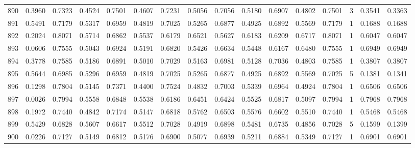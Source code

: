 \begin{tabular}{lrrrrrrrrrrrrrrr}
890 &      0.3960 &  0.7323 &  0.4524 &  0.7501 &  0.4607 &  0.7231 &  0.5056 &  0.7056 &  0.5180 &  0.6907 &   0.4802 &     0.7501 &      3 &                    0.3541 &                     0.3363 \\
891 &      0.5491 &  0.7179 &  0.5317 &  0.6959 &  0.4819 &  0.7025 &  0.5265 &  0.6877 &  0.4925 &  0.6892 &   0.5569 &     0.7179 &      1 &                    0.1688 &                     0.1688 \\
892 &      0.2024 &  0.8071 &  0.5714 &  0.6862 &  0.5537 &  0.6179 &  0.6521 &  0.5627 &  0.6183 &  0.6209 &   0.6717 &     0.8071 &      1 &                    0.6047 &                     0.6047 \\
893 &      0.0606 &  0.7555 &  0.5043 &  0.6924 &  0.5191 &  0.6820 &  0.5426 &  0.6634 &  0.5448 &  0.6167 &   0.6480 &     0.7555 &      1 &                    0.6949 &                     0.6949 \\
894 &      0.3778 &  0.7585 &  0.5186 &  0.6891 &  0.5010 &  0.7029 &  0.5163 &  0.6981 &  0.5128 &  0.7036 &   0.4803 &     0.7585 &      1 &                    0.3807 &                     0.3807 \\
895 &      0.5644 &  0.6985 &  0.5296 &  0.6959 &  0.4819 &  0.7025 &  0.5265 &  0.6877 &  0.4925 &  0.6892 &   0.5569 &     0.7025 &      5 &                    0.1381 &                     0.1341 \\
896 &      0.1298 &  0.7804 &  0.5145 &  0.7371 &  0.4400 &  0.7524 &  0.4832 &  0.7003 &  0.5339 &  0.6964 &   0.4924 &     0.7804 &      1 &                    0.6506 &                     0.6506 \\
897 &      0.0026 &  0.7994 &  0.5558 &  0.6848 &  0.5538 &  0.6186 &  0.6451 &  0.6424 &  0.5525 &  0.6817 &   0.5097 &     0.7994 &      1 &                    0.7968 &                     0.7968 \\
898 &      0.1972 &  0.7440 &  0.4842 &  0.7174 &  0.5147 &  0.6818 &  0.5762 &  0.6503 &  0.5576 &  0.6602 &   0.5510 &     0.7440 &      1 &                    0.5468 &                     0.5468 \\
899 &      0.5429 &  0.6828 &  0.5607 &  0.6617 &  0.5512 &  0.7028 &  0.4919 &  0.6898 &  0.5481 &  0.6735 &   0.4856 &     0.7028 &      5 &                    0.1599 &                     0.1399 \\
900 &      0.0226 &  0.7127 &  0.5149 &  0.6812 &  0.5176 &  0.6900 &  0.5077 &  0.6939 &  0.5211 &  0.6884 &   0.5349 &     0.7127 &      1 &                    0.6901 &                     0.6901 \\

\end{tabular}
